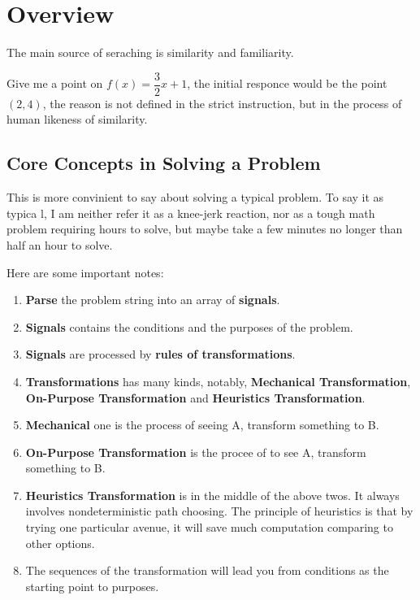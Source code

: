 \section{Overview}


The main source of seraching is similarity and familiarity.

Give me a point on $f(x) = \dfrac{3}{2} x + 1$, the initial responce would be the point $(2, 4)$, the reason is not defined in the strict instruction, but in the process of human likeness of similarity.

\subsection{Core Concepts in Solving a Problem}

This is more convinient to say about solving a typical problem. To say it as typica l, I am neither refer it as a knee-jerk reaction, nor as a tough math problem requiring hours to solve, but maybe take a few minutes no longer than half an hour to solve.

Here are some important notes:

\begin{enumerate}
  \item \textbf{Parse} the problem string into an array of \textbf{signals}.
  \item \textbf{Signals} contains the conditions and the purposes of the problem.
  \item \textbf{Signals} are processed by \textbf{rules of transformations}.
  \item \textbf{Transformations} has many kinds, notably, \textbf{Mechanical Transformation}, \textbf{On-Purpose Transformation} and \textbf{Heuristics Transformation}.
  \item \textbf{Mechanical} one is the process of seeing A, transform something to B.
  \item \textbf{On-Purpose Transformation} is the procee of to see A, transform something to B.
  \item \textbf{Heuristics Transformation} is in the middle of the above twos. It always involves nondeterministic path choosing. The principle of heuristics is that by trying one particular avenue, it will save much computation comparing to other options.
  \item The sequences of the transformation will lead you from conditions as the starting point to purposes.
\end{enumerate}

